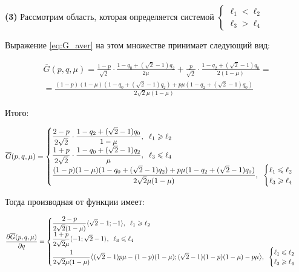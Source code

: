 \begin{flushleft}
	\textbf{(3)} Рассмотрим область, которая определяется системой
	$\begin{cases}
			\ell_1 < \ell_2 \\
			\ell_3 > \ell_4
	\end{cases}$

	Выражение \eqref{eq:G_aver} на этом множестве принимает следующий вид:	
	
	\begin{gather*}	
		\overline G(p,q,\mu)=
		\frac{1-p}{\sqrt{2}} \cdot \frac{1-q_0+(\sqrt{2}-1)q_2}{2\mu} +
		\frac{p}{\sqrt{2}} \cdot \frac{1-q_2+(\sqrt{2}-1)q_0}{2(1-\mu)}=\\	
		=\frac{(1-p)(1-\mu)(1-q_0+(\sqrt{2}-1)q_2)+p\mu(1-q_2+(\sqrt{2}-1)q_0)}
		{2\sqrt{2}\mu(1-\mu)}
	\end{gather*}
	
	Итого: 
	
	$$
	\overline G(p,q,\mu) =		
	\begin{cases}
		\dfrac{2-p}{2\sqrt{2}}\cdot\dfrac{1-q_2+(\sqrt{2}-1)q_0}{1-\mu} 
		,\hspace{2mm} \ell_1 \geqslant \ell_2		
		\\
		\dfrac{1+p}{2\sqrt{2}}\cdot\dfrac{1-q_0+(\sqrt{2}-1)q_2}{\mu}
		,\hspace{2mm} \ell_3 \leqslant \ell_4\\
		\dfrac{(1-p)(1-\mu)(1-q_0+(\sqrt{2}-1)q_2)+p\mu(1-q_2+(\sqrt{2}-1)q_0)}
		{2\sqrt{2}\mu(1-\mu)}
		,\hspace{2mm}
		\begin{cases}
			\ell_1 \leqslant \ell_2\\
			\ell_3 \geqslant \ell_4\\
		\end{cases}
	\end{cases}
	$$	
	
	Тогда производная от функции имеет:
	
	$$
	\frac{\partial \overline{G}(p,q,\mu)}{\partial q}=
	\begin{cases}
		\dfrac{2-p}{2\sqrt{2}(1-\mu)} \langle \sqrt{2}-1; -1 \rangle 
 		,\hspace{2mm}
 		\ell_1 \geqslant \ell_2\\
		
		\dfrac{1+p}{2\sqrt{2}\mu} \langle -1; \sqrt{2}-1 \rangle
		,\hspace{2mm}
		\ell_3 \leqslant \ell_4\\
		
		\dfrac{1}{2\sqrt{2}\mu(1-\mu)}
		\big \langle 
			(\sqrt{2} - 1)p\mu -(1-p)(1-\mu);
			(\sqrt{2} - 1)(1-p)(1-\mu) - p\mu			
		\big \rangle
		,\hspace{2mm}
		\begin{cases}
			\ell_1 \leqslant \ell_2\\
			\ell_3 \geqslant \ell_4\\
		\end{cases}
	\end{cases}
	$$
	

\end{flushleft}
